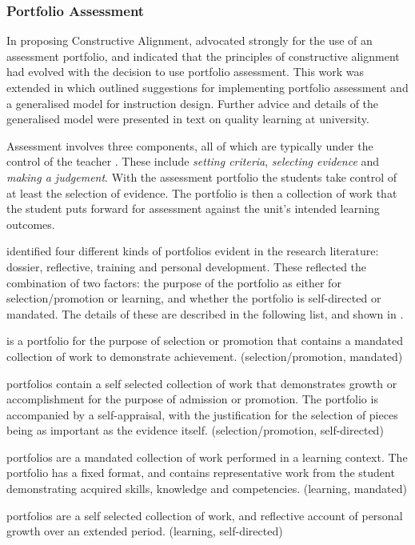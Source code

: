 \subsubsection{Portfolio Assessment} %
\label{sub:portfolio_assessment}

In proposing Constructive Alignment, \citet{Biggs:1996c} advocated strongly for the use of an assessment portfolio, and indicated that the principles of constructive alignment had evolved with the decision to use portfolio assessment. This work was extended in \cite{Biggs:1997} which outlined suggestions for implementing portfolio assessment and a generalised model for instruction design. Further advice and details of the generalised model were presented in \citet{Biggs:2007} text on quality learning at university.

Assessment involves three components, all of which are typically under the control of the teacher \cite{Biggs:1997}. These include \emph{setting criteria}, \emph{selecting evidence} and \emph{making a judgement}. With the assessment portfolio the students take control of at least the selection of evidence. The portfolio is then a collection of work that the student puts forward for assessment against the unit's intended learning outcomes.

\citet{Smith:2001,Smith:2003} identified four different kinds of portfolios evident in the research literature: dossier, reflective, training and personal development. These reflected the combination of two factors: the purpose of the portfolio as either for selection/promotion or learning, and whether the portfolio is self-directed or mandated. The details of these are described in the following list, and shown in .

\begin{description}
	\item[Dossier] is a portfolio for the purpose of selection or promotion that contains a mandated collection of work to demonstrate achievement. (selection/promotion, mandated)
	\item[Reflective] portfolios contain a self selected collection of work that demonstrates growth or accomplishment for the purpose of admission or promotion. The portfolio is accompanied by a self-appraisal, with the justification for the selection of pieces being as important as the evidence itself. (selection/promotion, self-directed)
	\item[Training] portfolios are a mandated collection of work performed in a learning context. The portfolio has a fixed format, and contains representative work from the student demonstrating acquired skills, knowledge and competencies. (learning, mandated)
	\item[Personal development] portfolios are a self selected collection of work, and reflective account of personal growth over an extended period. (learning, self-directed)
\end{description}

